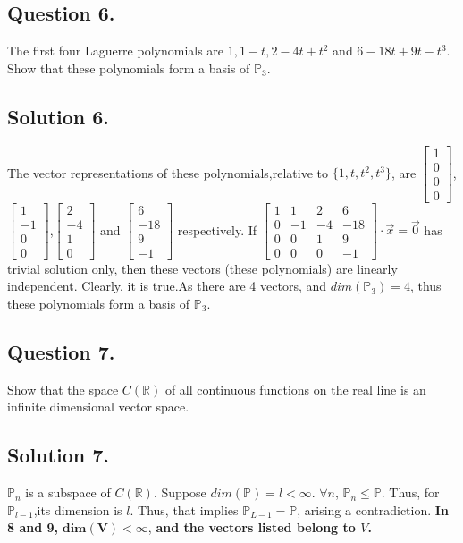 \documentclass{article}
\begin{document}
\subsection*{Question 6.}
The first four Laguerre polynomials are $1,1-t,2-4t+t^2$ and $6-18t+9t-t^3$. Show that these polynomials form a basis of $\mathbb{P}_3$.
\subsection*{Solution 6.}
The vector representations of these polynomials,relative to $\{1,t,t^2,t^3\}$, are $\left[\begin{array}{c}1\\0\\0\\0\end{array}\right]$,$\left[\begin{array}{c}1\\-1\\0\\0\end{array}\right]$,$\left[\begin{array}{c}2\\-4\\1\\0\end{array}\right]$ and $\left[\begin{array}{c}6\\-18\\9\\-1\end{array}\right]$ respectively.\newline
If $\left[\begin{array}{cccc}1&1&2&6\\0&-1&-4&-18\\0&0&1&9\\0&0&0&-1\end{array}\right]\cdot \vec{x}=\vec{0}$ has trivial solution only, then these vectors (these polynomials) are linearly independent. Clearly, it is true.As there are 4 vectors, and $dim(\mathbb{P}_3)=4$, thus these polynomials form a basis of $\mathbb{P}_3$.
\subsection*{Question 7.}
Show that the space $C(\mathbb{R})$ of all continuous functions on the real line is an infinite dimensional vector space.
\subsection*{Solution 7.}
$\mathbb{P}_n$ is a subspace of $C(\mathbb{R})$.\newline
Suppose $dim(\mathbb{P})=l<\infty$. $\forall n$, $\mathbb{P}_n\leq\mathbb{P}$. Thus, for $\mathbb{P}_{l-1}$,its dimension is $l$. Thus, that implies $\mathbb{P}_{L-1}=\mathbb{P}$, arising a contradiction.
\newline
\textbf{ In 8 and 9, }$\mathbf{dim(V)<\infty}$, \textbf{and the vectors listed belong to $V$.}
\end{document}
